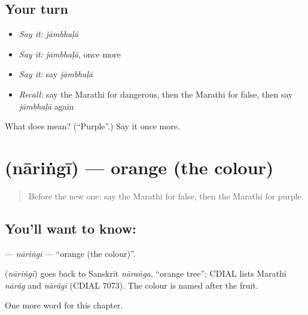 \subsection*{Your turn}
\begin{itemize}
\raggedright
  \item \emph{Say it:} \emph{jāmbhaḷā}
  \item \emph{Say it:} \emph{jāmbhaḷā}, once more
  \item \emph{Say it:} say \emph{jāmbhaḷā}
  \item \emph{Recall:} say the Marathi for dangerous, then the Marathi for false, then say \emph{jāmbhaḷā} again
\end{itemize}

\begin{tcolorbox}[breakable,colback=teal!4,colframe=teal!35!black,title={Before you move on}]
What does  mean? (\textquotedblleft{}Purple\textquotedblright{}.) Say it once more.
\end{tcolorbox}
\section[\texorpdfstring{\mr{नारिंगी} (nāriṅgī)}{नारिंगी (nāriṅgī)}]{ (nāriṅgī) — orange (the colour)}

\label{lesson:MR-C152-naringi}



\begin{quote}
Before the new one: say the Marathi for false, then the Marathi for purple.
\end{quote}

\subsection*{You'll want to know: }
\textbf{} — \emph{nāriṅgī} — \textquotedblleft{}orange (the colour)\textquotedblright{}.

\begin{cousinweb}
\textbf{} (\emph{nāriṅgī}) goes back to Sanskrit \emph{nāraṅga}, \textquotedblleft{}orange tree\textquotedblright{}; CDIAL lists Marathi \emph{nārãg} and \emph{nārãgī} (CDIAL 7073). The colour is named after the fruit.
\end{cousinweb}

\begin{grammarlens}[title={What you've built}]
One more word for this chapter.
\end{grammarlens}

